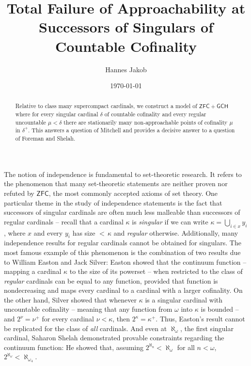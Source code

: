 \documentclass[a4paper]{amsart}
\title[Failure of Approachability]{Total Failure of Approachability at Successors of Singulars of Countable Cofinality}
\author{Hannes Jakob}
\date{\today}
\theoremstyle{definition}
\theoremstyle{remark}
\theoremstyle{plain}
\numberwithin{mydef}{section}
\newcommand{\ZFC}{\mathsf{ZFC}}
\newcommand{\GCH}{\mathsf{GCH}}
\begin{document}
	
	
	
	
	\begin{abstract}
		Relative to class many supercompact cardinals, we construct a model of $\ZFC+\GCH$ where for every singular cardinal $\delta$ of countable cofinality and every regular uncountable $\mu<\delta$ there are stationarily many non-approachable points of cofinality $\mu$ in $\delta^+$. This answers a question of Mitchell and provides a decisive answer to a question of Foreman and Shelah.
	\end{abstract}
		
	\maketitle
	
	The notion of independence is fundamental to set-theoretic research. It refers to the phenomenon that many set-theoretic statements are neither proven nor refuted by $\ZFC$, the most commonly accepted axioms of set theory. One particular theme in the study of independence statements is the fact that successors of singular cardinals are often much less malleable than successors of regular cardinals -- recall that a cardinal $\kappa$ is \emph{singular} if we can write $\kappa=\bigcup_{i\in x}y_i$, where $x$ and every $y_i$ has size ${<}\,\kappa$ and \emph{regular} otherwise. Additionally, many independence results for regular cardinals cannot be obtained for singulars. The most famous example of this phenomenon is the combination of two results due to William Easton and Jack Silver: Easton showed that the continuum function -- mapping a cardinal $\kappa$ to the size of its powerset -- when restricted to the class of \emph{regular} cardinals can be equal to any function, provided that function is nondecreasing and maps every cardinal to a cardinal with a larger cofinality. On the other hand, Silver showed that whenever $\kappa$ is a singular cardinal with uncountable cofinality -- meaning that any function from $\omega$ into $\kappa$ is bounded -- and $2^{\nu}=\nu^+$ for every cardinal $\nu<\kappa$, then $2^{\kappa}=\kappa^+$. Thus, Easton's result cannot be replicated for the class of \emph{all} cardinals. And even at $\aleph_{\omega}$, the first singular cardinal, Saharon Shelah demonstrated provable constraints regarding the continuum function: He showed that, assuming $2^{\aleph_n}<\aleph_{\omega}$ for all $n<\omega$, $2^{\aleph_{\omega}}<\aleph_{\omega_4}$.
	
\end{document}
